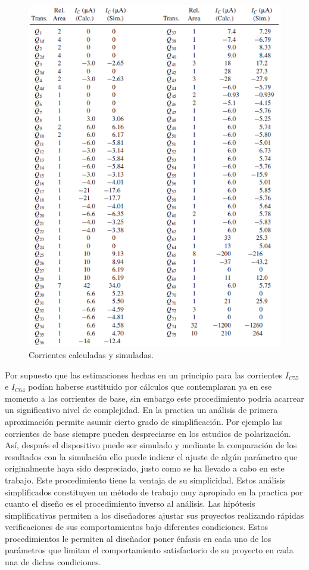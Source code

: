 \documentclass[12pt,a4paper,final,headinclude,footinclude,BCOR5mm]{scrartcl}
\begin{document}
\begin{figure}[!h]
\begin{center}
\includegraphics[width=400pt]{./imagenes/642.png}
\end{center}
\caption{Corrientes calculadas y simuladas.}
\label{642}
\end{figure}

Por supuesto que las estimaciones hechas en un principio para las corrientes $I_{C55}$ e $I_{C64}$ podían haberse sustituido por cálculos que contemplaran ya en ese momento a las corrientes de base, sin embargo este procedimiento podría acarrear un significativo nivel de complejidad. En la practica un análisis de primera aproximación permite asumir cierto grado de simplificación. Por ejemplo las corrientes de base siempre pueden despreciarse en los estudios de polarización. Así, después el dispositivo puede ser simulado y mediante la comparación de los resultados con la simulación ello puede indicar el ajuste de algún parámetro que originalmente haya sido despreciado, justo como se ha llevado a cabo en este trabajo. Este procedimiento tiene la ventaja de su simplicidad. Estos análisis simplificados constituyen un método de trabajo muy apropiado en la practica por cuanto el diseño es el procedimiento inverso al análisis. Las hipótesis simplificativas permiten a los diseñadores ajustar sus proyectos realizando rápidas verificaciones de sus comportamientos bajo diferentes condiciones. Estos procedimientos le permiten al diseñador poner énfasis en cada uno de los parámetros que limitan el comportamiento satisfactorio de su proyecto en cada una de dichas condiciones.
\end{document}
